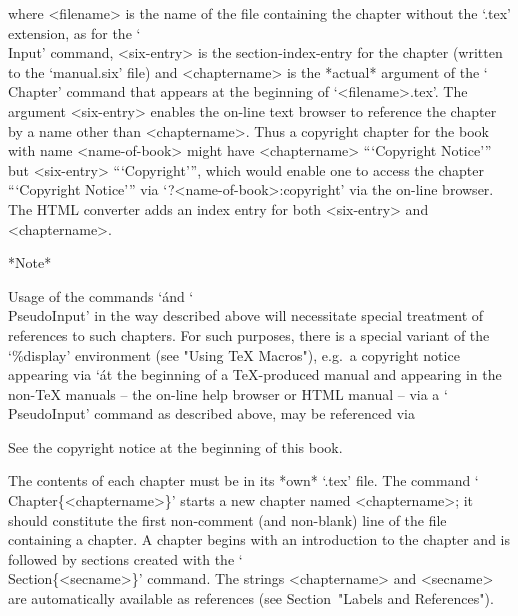 \item{}
where <filename> is the name of the file containing the  chapter  without
the `.tex' extension, as for the `\\Input' command,  <six-entry>  is  the
section-index-entry for the chapter (written to  the  `manual.six'  file)
and <chaptername> is the *actual* argument  of  the  `\\Chapter'  command
that  appears  at  the  beginning  of  `<filename>.tex'.   The   argument
<six-entry> enables the on-line text browser to reference the chapter  by
a name other than <chaptername>. Thus a copyright chapter  for  the  book
with name <name-of-book> might have <chaptername> ```Copyright  Notice'''
but <six-entry> ```Copyright''', which would enable  one  to  access  the
chapter ```Copyright Notice''' via  `?<name-of-book>:copyright'  via  the
on-line browser.  The  HTML  converter  adds  an  index  entry  for  both
<six-entry> and <chaptername>.

\endlist

*Note*

Usage of the commands `\' and `\\PseudoInput' in the way  described
above will necessitate special treatment of references to such  chapters.
For such  purposes,  there  is  a  special  variant  of  the  `\%display'
environment (see "Using TeX Macros"), e.g.~a copyright  notice  appearing
via `\' at the beginning of a {\TeX}-produced manual and  appearing
in the non-{\TeX} manuals -- the on-line help browser or HTML  manual  --
via a `\\PseudoInput' command as described above, may be referenced via

\begintt
See the copyright notice at the beginning of this book.
\endtt


\indextt{\\Chapter}\indextt{\\Section}
The contents of each chapter must  be  in  its  *own*  `.tex'  file.  The
command  `\\Chapter\{<chaptername>\}'  starts   a   new   chapter   named
<chaptername>; it should constitute the first non-comment (and non-blank)
line of  the  file  containing  a  chapter.  A  chapter  begins  with  an
introduction to the chapter and is followed by sections created with  the
`\\Section\{<secname>\}' command. The strings <chaptername> and <secname>
are  automatically  available  as  references  (see  Section~"Labels  and
References").

